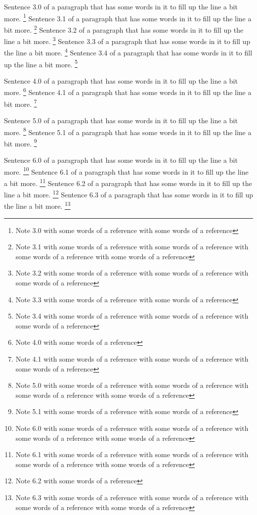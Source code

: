 Sentence 3.0 of a paragraph that has some words in it to fill up the line a bit more. \footnote{Note 3.0 with some words of a reference with some words of a reference} Sentence 3.1 of a paragraph that has some words in it to fill up the line a bit more. \footnote{Note 3.1 with some words of a reference with some words of a reference with some words of a reference with some words of a reference} Sentence 3.2 of a paragraph that has some words in it to fill up the line a bit more. \footnote{Note 3.2 with some words of a reference with some words of a reference with some words of a reference} Sentence 3.3 of a paragraph that has some words in it to fill up the line a bit more. \footnote{Note 3.3 with some words of a reference with some words of a reference} Sentence 3.4 of a paragraph that has some words in it to fill up the line a bit more. \footnote{Note 3.4 with some words of a reference with some words of a reference with some words of a reference}

Sentence 4.0 of a paragraph that has some words in it to fill up the line a bit more. \footnote{Note 4.0 with some words of a reference} Sentence 4.1 of a paragraph that has some words in it to fill up the line a bit more. \footnote{Note 4.1 with some words of a reference with some words of a reference with some words of a reference}

Sentence 5.0 of a paragraph that has some words in it to fill up the line a bit more. \footnote{Note 5.0 with some words of a reference with some words of a reference with some words of a reference with some words of a reference} Sentence 5.1 of a paragraph that has some words in it to fill up the line a bit more. \footnote{Note 5.1 with some words of a reference with some words of a reference}

Sentence 6.0 of a paragraph that has some words in it to fill up the line a bit more. \footnote{Note 6.0 with some words of a reference with some words of a reference with some words of a reference with some words of a reference} Sentence 6.1 of a paragraph that has some words in it to fill up the line a bit more. \footnote{Note 6.1 with some words of a reference with some words of a reference with some words of a reference with some words of a reference} Sentence 6.2 of a paragraph that has some words in it to fill up the line a bit more. \footnote{Note 6.2 with some words of a reference} Sentence 6.3 of a paragraph that has some words in it to fill up the line a bit more. \footnote{Note 6.3 with some words of a reference with some words of a reference with some words of a reference with some words of a reference}

